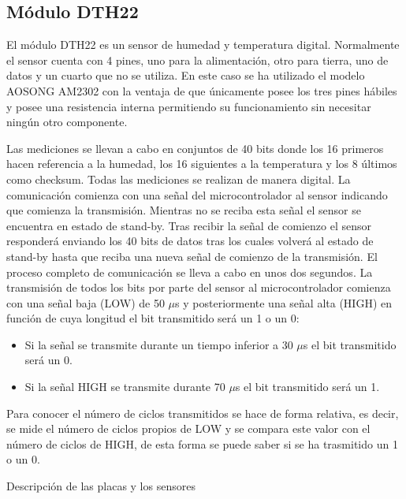 \subsection{M\'odulo DTH22}\label{subsec:dht22}

El m\'odulo DTH22 es un sensor de humedad y temperatura
digital. Normalmente el sensor cuenta con 4 pines, uno para la
alimentaci\'on, otro para tierra, uno de datos y un cuarto que no se
utiliza. En este caso se ha utilizado el modelo AOSONG AM2302 con la
ventaja de que \'unicamente posee los tres pines h\'abiles y posee una
resistencia interna permitiendo su funcionamiento sin necesitar
ning\'un otro componente.

Las mediciones se llevan a cabo en conjuntos de 40 bits donde los 16
primeros hacen referencia a la humedad, los 16 siguientes a la
temperatura y los 8 \'ultimos como checksum. Todas las mediciones se
realizan de manera digital. La comunicaci\'on comienza con una se\~nal
del microcontrolador al sensor indicando que comienza la
transmisi\'on. Mientras no se reciba esta se\~nal el sensor se encuentra
en estado de stand-by. Tras recibir la se\~nal de comienzo el sensor
responder\'a enviando los 40 bits de datos tras los cuales volver\'a
al estado de stand-by hasta que reciba una nueva se\~nal de comienzo de
la transmisi\'on. El proceso completo de comunicaci\'on se lleva a
cabo en unos dos segundos. La transmisi\'on de todos los bits por
parte del sensor al microcontrolador comienza con una se\~nal baja (LOW)
de 50 $\mu$s y posteriormente una se\~nal alta (HIGH) en funci\'on de
cuya longitud el bit transmitido ser\'a un 1 o un 0:
\begin{itemize}
\item Si la se\~nal se transmite durante un tiempo inferior a 30 $\mu$s
  el bit transmitido ser\'a un 0.

\item Si la se\~nal HIGH se transmite durante 70 $\mu$s el bit
  transmitido ser\'a un 1.

\end{itemize}

Para conocer el n\'umero de ciclos transmitidos se hace de forma relativa, es decir,
se mide el n\'umero de ciclos propios de LOW y se compara este valor con
el n\'umero de ciclos de HIGH, de esta forma se puede saber si se ha trasmitido
un 1 o un 0.

Descripción de las placas y los sensores
